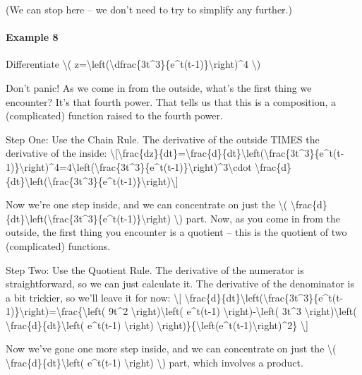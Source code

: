 (We can stop here -- we don't need to try to simplify any further.)

\hypertarget{example-8}{%
\paragraph{Example 8}\label{example-8}}

Differentiate \textbackslash{}(
z=\textbackslash{}left(\textbackslash{}dfrac\{3t\^{}3\}\{e\^{}t(t-1)\}\textbackslash{}right)\^{}4
\textbackslash{})

Don't panic! As we come in from the outside, what's the first thing we
encounter? It's that fourth power. That tells us that this is a
composition, a (complicated) function raised to the fourth power.

Step One: Use the Chain Rule. The derivative of the outside TIMES the
derivative of the inside:
\textbackslash{}{[}\textbackslash{}frac\{dz\}\{dt\}=\textbackslash{}frac\{d\}\{dt\}\textbackslash{}left(\textbackslash{}frac\{3t\^{}3\}\{e\^{}t(t-1)\}\textbackslash{}right)\^{}4=4\textbackslash{}left(\textbackslash{}frac\{3t\^{}3\}\{e\^{}t(t-1)\}\textbackslash{}right)\^{}3\textbackslash{}cdot
\textbackslash{}frac\{d\}\{dt\}\textbackslash{}left(\textbackslash{}frac\{3t\^{}3\}\{e\^{}t(t-1)\}\textbackslash{}right)\textbackslash{}{]}

Now we're one step inside, and we can concentrate on just the
\textbackslash{}(
\textbackslash{}frac\{d\}\{dt\}\textbackslash{}left(\textbackslash{}frac\{3t\^{}3\}\{e\^{}t(t-1)\}\textbackslash{}right)
\textbackslash{}) part. Now, as you come in from the outside, the first
thing you encounter is a quotient -- this is the quotient of two
(complicated) functions.

Step Two: Use the Quotient Rule. The derivative of the numerator is
straightforward, so we can just calculate it. The derivative of the
denominator is a bit trickier, so we'll leave it for now:
\textbackslash{}{[}
\textbackslash{}frac\{d\}\{dt\}\textbackslash{}left(\textbackslash{}frac\{3t\^{}3\}\{e\^{}t(t-1)\}\textbackslash{}right)=\textbackslash{}frac\{\textbackslash{}left(
9t\^{}2 \textbackslash{}right)\textbackslash{}left( e\^{}t(t-1)
\textbackslash{}right)-\textbackslash{}left( 3t\^{}3
\textbackslash{}right)\textbackslash{}left(
\textbackslash{}frac\{d\}\{dt\}\textbackslash{}left( e\^{}t(t-1)
\textbackslash{}right)
\textbackslash{}right)\}\{\textbackslash{}left(e\^{}t(t-1)\textbackslash{}right)\^{}2\}
\textbackslash{}{]}

Now we've gone one more step inside, and we can concentrate on just the
\textbackslash{}( \textbackslash{}frac\{d\}\{dt\}\textbackslash{}left(
e\^{}t(t-1) \textbackslash{}right) \textbackslash{}) part, which
involves a product.

